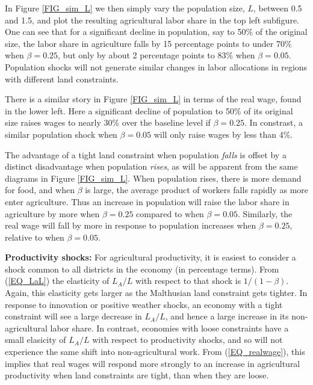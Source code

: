 \documentclass[11pt]{article}
\begin{document}
In Figure \ref{FIG_sim_L} we then simply vary the population size, $L$, between 0.5 and 1.5, and plot the resulting agricultural labor share in the top left subfigure. One can see that for a significant decline in population, say to 50\% of the original size, the labor share in agriculture falls by 15 percentage points to under 70\% when $\beta=0.25$, but only by about 2 percentage points to 83\% when $\beta=0.05$. Population shocks will not generate similar changes in labor allocations in regions with different land constraints. 

There is a similar story in Figure \ref{FIG_sim_L} in terms of the real wage, found in the lower left. Here a significant decline of population to 50\% of its original size raises wages to nearly 30\% over the baseline level if $\beta=0.25$. In constrast, a similar population shock when $\beta=0.05$ will only raise wages by less than 4\%. 

The advantage of a tight land constraint when population \textit{falls} is offset by a distinct disadvantage when population \textit{rises}, as will be apparent from the same diagrams in Figure \ref{FIG_sim_L}. When population rises, there is more demand for food, and when $\beta$ is large, the average product of workers falls rapidly as more enter agriculture. Thus an increase in population will raise the labor share in agriculture by more when $\beta=0.25$ compared to when $\beta=0.05$. Similarly, the real wage will fall by more in response to population increases when $\beta=0.25$, relative to when $\beta=0.05$.

\vspace{.5cm}\noindent\textbf{Productivity shocks:} For agricultural productivity, it is easiest to consider a shock common to all districts in the economy (in percentage terms). From (\ref{EQ_LaL}) the elasticity of $L_A/L$ with respect to that shock is $1/(1-\beta)$. Again, this elasticity gets larger as the Malthusian land constraint gets tighter. In response to innovation or positive weather shocks, an economy with a tight constraint will see a large decrease in $L_A/L$, and hence a large increase in its non-agricultural labor share. In contrast, economies with loose constraints have a small elasicity of $L_A/L$ with respect to productivity shocks, and so will not experience the same shift into non-agricultural work. From (\ref{EQ_realwage}), this implies that real wages will respond more strongly to an increase in agricultural productivity when land constraints are tight, than when they are loose.
\end{document}
